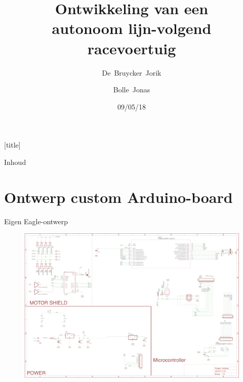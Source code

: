 \documentclass[t,12pt,english
\ifx\beamermode\undefined\else,\beamermode\fi
]{beamer}
\title{Ontwikkeling van een\\autonoom lijn-volgend\\racevoertuig}
\author{\mbox{De Bruycker Jorik} \and \mbox{Bolle Jonas}}
\date{09/05/18}
\institute{3ELICTE}
\begin{document}
[title]

\begin{frame}
    \titlepage
\end{frame}

\usedefaultcanvas

\emptyfooter
\begin{frame}[noframenumbering]{Inhoud}
        \tableofcontents
    \end{frame}
\largefooter

\section{Ontwerp custom Arduino-board}\label{sec:pcb}

\begin{frame}{Eigen Eagle-ontwerp}
\begin{figure}[H]
	\centering
	\includegraphics[width=\textwidth,height=0.8\textheight,keepaspectratio]{eigenschematic.png}
\end{figure}
\end{frame}
\end{document}

